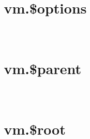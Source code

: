 \begin{lstlisting}[language=JavaScript]

\end{lstlisting}

\section{vm.\$options}








\begin{lstlisting}[language=JavaScript]

\end{lstlisting}




\begin{lstlisting}[language=JavaScript]

\end{lstlisting}




\begin{lstlisting}[language=JavaScript]

\end{lstlisting}




\section{vm.\$parent}







\begin{lstlisting}[language=JavaScript]

\end{lstlisting}




\begin{lstlisting}[language=JavaScript]

\end{lstlisting}




\begin{lstlisting}[language=JavaScript]

\end{lstlisting}



\section{vm.\$root}








